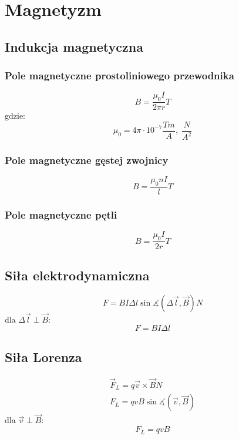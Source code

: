   \chapter{Magnetyzm}
    \section{Indukcja magnetyczna}
      \subsection{Pole magnetyczne prostoliniowego przewodnika}
        \begin{equation}
          B = \frac{\mu_0 I}{2\pi r} \unit{T}
        \end{equation}
        gdzie:
        \begin{equation}
          \mu_0 = 4\pi\cdot 10^{-7} \unit{\frac{Tm}{A},\;\frac{N}{A^2}}
        \end{equation}
      \subsection{Pole magnetyczne gęstej zwojnicy}
        \begin{equation}
          B = \frac{\mu_0 nI}{l} \unit{T}
        \end{equation}
      \subsection{Pole magnetyczne pętli}
        \begin{equation}
          B = \frac{\mu_0 I}{2r} \unit{T}
        \end{equation}
    \section{Siła elektrodynamiczna}
      \begin{equation}
        F = BI\Delta l\sin\measuredangle(\Delta\vec l, \vec B) \unit{N}
      \end{equation}
      dla $\Delta\vec l \perp \vec B$:
      \begin{equation}
        F = BI\Delta l
      \end{equation}
  \section{Siła Lorenza}
    \begin{gather}
      \vec F_L = q\vec v\times\vec B \unit{N}\\
      F_L = qvB\sin\measuredangle(\vec v, \vec B)
    \end{gather}
    dla $\vec v\perp\vec B$:
    \begin{equation}
      F_L = qvB
    \end{equation}
